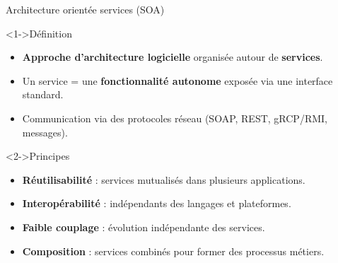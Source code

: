 \documentclass[aspectratio=169,10pt]{beamer}
\begin{document}
\begin{frame}{Architecture orientée services (SOA)}

    \begin{alertblock}<1->{Définition}
      \begin{itemize}
        \item \textbf{Approche d’architecture logicielle} organisée autour de \textbf{services}.
        \item Un service = une \textbf{fonctionnalité autonome} exposée via une interface standard.
        \item Communication via des protocoles réseau (SOAP, REST, gRCP/RMI, messages).
      \end{itemize}
    \end{alertblock}

    \begin{alertblock}<2->{Principes}
      \begin{itemize}
        \item \textbf{Réutilisabilité} : services mutualisés dans plusieurs applications.
        \item \textbf{Interopérabilité} : indépendants des langages et plateformes.
        \item \textbf{Faible couplage} : évolution indépendante des services.
        \item \textbf{Composition} : services combinés pour former des processus métiers.
      \end{itemize}
    \end{alertblock}

\end{frame}

\end{document}
